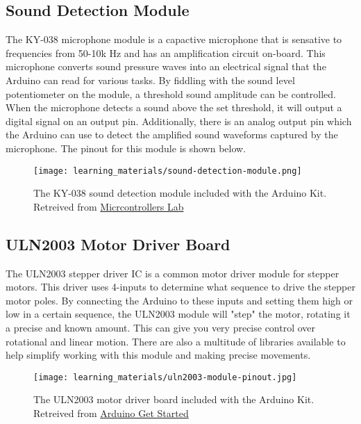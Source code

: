     \subsection*{Sound Detection Module}
    The KY-038 microphone module is a capactive microphone that is sensative to frequencies from 50-10k Hz and has an amplification circuit on-board.
    This microphone converts sound pressure waves into an electrical signal that the Arduino can read for various tasks.
    By fiddling with the sound level potentiometer on the module, a threshold sound amplitude can be controlled.
    When the microphone detects a sound above the set threshold, it will output a digital signal on an output pin.
    Additionally, there is an analog output pin which the Arduino can use to detect the amplified sound waveforms captured by the microphone.
    The pinout for this module is shown below.

    \begin{figure}[h!]
        \texttt{[image: learning\_materials/sound-detection-module.png]}
        \caption[Sound Detection Module]{The KY-038 sound detection module included with the Arduino Kit. 
        Retreived from \href{https://microcontrollerslab.com/ky-038-microphone-sound-sensor-module-arduino-tutorial/}
        {Micrcontrollers Lab}}
    \end{figure}

    \subsection*{ULN2003 Motor Driver Board}
    The ULN2003 stepper driver IC is a common motor driver module for stepper motors. 
    This driver uses 4-inputs to determine what sequence to drive the stepper motor poles.
    By connecting the Arduino to these inputs and setting them high or low in a certain sequence, the ULN2003 module will "step" the motor, rotating it a precise and known amount.
    This can give you very precise control over rotational and linear motion.
    There are also a multitude of libraries available to help simplify working with this module and making precise movements.

    \begin{figure}[h!]
        \texttt{[image: learning\_materials/uln2003-module-pinout.jpg]}
        \caption[Motor Driver]{The ULN2003 motor driver board included with the Arduino Kit. 
        Retreived from \href{https://arduinogetstarted.com/images/tutorial/uln2003-module-pinout.jpg}
        {Arduino Get Started}}
    \end{figure}

